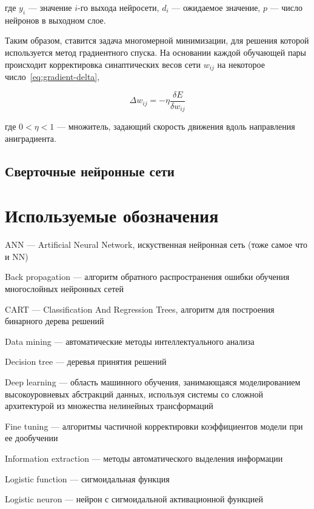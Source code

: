 \documentclass[a4paper,14pt]{extarticle} %
\begin{document}
\noindent где $y_i$ --- значение $i$-го выхода нейросети, $d_i$ --- ожидаемое значение, $p$ --- число нейронов в выходном слое.

Таким образом, ставится задача многомерной минимизации, для решения которой используется метод градиентного спуска. На основании каждой обучающей пары происходит корректировка синаптических весов сети $w_{ij}$ на некоторое число~\ref{eq:gradient-delta},

\begin{equation}\label{eq:gradient-delta}
\Delta w_{ij}=-\eta \frac{\delta E}{\delta w_{ij}}
\end{equation}

\noindent где $0<\eta < 1$ --- множитель, задающий скорость движения вдоль направления аниградиента.

\subsection{Сверточные нейронные сети}
\hspace{\parindent} 

\newpage
\section*{Используемые обозначения}
ANN --- Artificial Neural Network, искуственная нейронная сеть (тоже самое что и NN)

\noindent Back propagation --- алгоритм обратного распространения ошибки обучения многослойных нейронных сетей 

\noindent CART --- Classification And Regression Trees, алгоритм  для построения бинарного дерева решений

\noindent Data mining --- автоматические методы интеллектуального анализа

\noindent Decision tree --- деревья принятия решений

\noindent Deep learning --- область машинного обучения, занимающаяся моделированием высокоуровневых абстракций данных, используя системы со сложной архитектурой из множества нелинейных трансформаций

\noindent Fine tuning --- алгоритмы частичной корректировки коэффициентов модели при ее дообучении

\noindent Information extraction --- методы автоматического выделения информации

\noindent Logistic function --- сигмоидальная функция 

\noindent Logistic neuron --- нейрон с сигмоидальной активационной функцией
\end{document}
